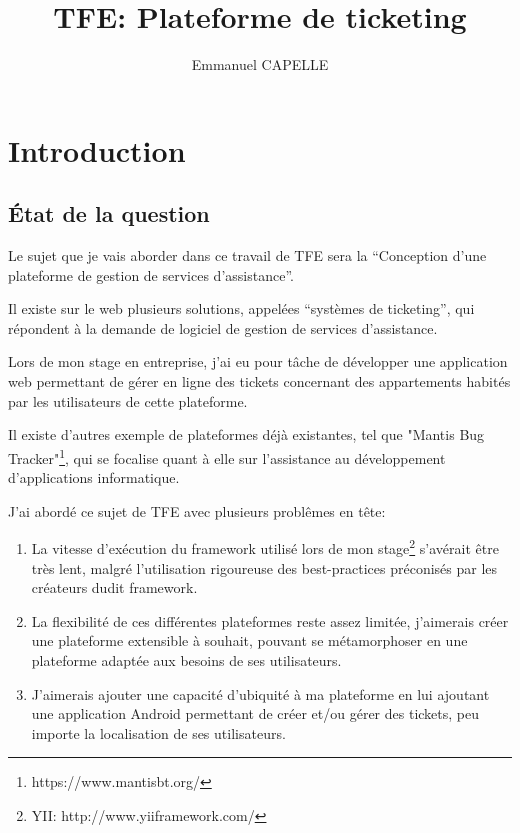 \documentclass[12pt,table,a4paper]{report}
\title{TFE: Plateforme de ticketing}
\author{Emmanuel CAPELLE}
\date{}
\begin{document}
\maketitle

\newpage

\tableofcontents

\newpage

\chapter{Introduction}

\section{État de la question}
Le sujet que je vais aborder dans ce travail de TFE sera la “Conception d’une plateforme de gestion de services d’assistance”.

Il existe sur le web plusieurs solutions, appelées “systèmes de ticketing”, qui répondent à la demande de logiciel de gestion de services d’assistance.

Lors de mon stage en entreprise, j’ai eu pour tâche de développer une application web permettant de gérer en ligne des tickets concernant des appartements habités par les utilisateurs de cette plateforme.

Il existe d’autres exemple de plateformes déjà existantes, tel que "Mantis Bug Tracker"\footnote{https://www.mantisbt.org/}, qui se focalise quant à elle sur l’assistance au développement d’applications informatique.

J’ai abordé ce sujet de TFE avec plusieurs problêmes en tête:
\begin{enumerate}
\item{La vitesse d’exécution du framework utilisé lors de mon stage\footnote{YII: http://www.yiiframework.com/} s’avérait être très lent, malgré l’utilisation rigoureuse des best-practices préconisés par les créateurs dudit framework.}
\item{La flexibilité de ces différentes plateformes reste assez limitée, j’aimerais créer une plateforme extensible à souhait, pouvant se métamorphoser en une plateforme adaptée aux besoins de ses utilisateurs.}
\item{J’aimerais ajouter une capacité d’ubiquité à ma plateforme en lui ajoutant une application Android permettant de créer et/ou gérer des tickets, peu importe la localisation de ses utilisateurs.}
\end{enumerate}
\end{document}
